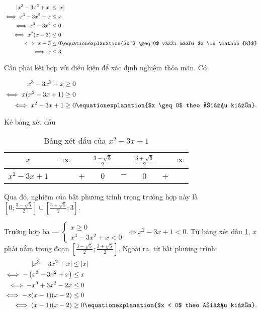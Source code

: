 \begin{align*}
   |x^3 - 3x^2 + x| &\leq |x| \\
   \iff x^3 - 3x^2 + x &\leq x \\
   \iff x^3 - 3x^2 &\leq 0 \\
   \iff x^2(x - 3) &\leq 0 \\
   \iff x - 3 &\leq 0 \equationexplanation{$x^2 \geq 0$ với mọi $x \in \mathbb{R}$} \\
   \iff x &\leq 3.
\end{align*}

Cần phải kết hợp với điều kiện để xác định nghiệm thỏa mãn. Có

\begin{align*}
   x^3 - 3x^2 + x &\geq 0 \\
   \iff x(x^2 - 3x + 1) &\geq 0 \\
   \iff x^2 - 3x + 1 &\geq 0 \equationexplanation{$x \geq 0$ theo điều kiện}.
\end{align*}

Kẻ bảng xét dấu

\begin{table}[H]
   \centering
   \begin{tabular}{|c|ccccccc|}
   \hline
   $x$           & $-\infty$ &   & $\frac{3 - \sqrt{5}}{2}$ &     & $\frac{3 + \sqrt{5}}{2}$ &   & $\infty$ \\
   \hline
   $x^{2}-3x+1$  &           & + &                 0                 & $-$ &                0                 & + &           \\
   \hline
   \end{tabular}
   \caption{Bảng xét dấu của $x^{2}-3x+1$}
   \label{tab:toan_hoc_nen_tang:ham_so_mot_bien:ham_tung_phan:bxd12_x2_t3x_1}
\end{table}

Qua đó, nghiệm của bất phương trình trong trường hợp này là $\left[0; \frac{3 - \sqrt{5}}{2}\right] \cup \left[\frac{3 + \sqrt{5}}{2}; 3\right]$.

\textcolor{colorEmphasisGreen}{Trường hợp ba --- $
\begin{cases}
   x \geq 0 \\
   x^3 - 3x^2 + x < 0
\end{cases}$} $\iff x^2 - 3x + 1 < 0$. Từ bảng xét dấu \ref{tab:toan_hoc_nen_tang:ham_so_mot_bien:ham_tung_phan:bxd12_x2_t3x_1}, $x$ phải nằm trong đoạn $\left[\frac{3 - \sqrt{5}}{2}; \frac{3 + \sqrt{5}}{2}\right]$. Ngoài ra, từ bất phương trình:
\begin{align*}
   |x^3 - 3x^2 + x| &\leq |x| \\
   \iff -\left(x^3 - 3x^2 + x\right) &\leq x \\
   \iff -x^3 + 3x^2 - 2x &\leq 0 \\
   \iff -x(x-1)(x-2) &\leq 0 \\
   \iff (x - 1)(x - 2) &\geq 0 \equationexplanation{$x < 0$ theo điều kiện}.
\end{align*}

